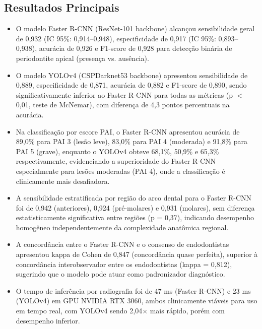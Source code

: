 \subsection{Resultados Principais}
\begin{itemize}
  \item O modelo Faster R-CNN (ResNet-101 backbone) alcançou
        sensibilidade geral de 0,932 (IC 95\%: 0,914--0,948),
        especificidade de 0,917 (IC 95\%: 0,893--0,938), acurácia de
        0,926 e F1-score de 0,928 para detecção binária de
        periodontite apical (presença vs. ausência).
  \item O modelo YOLOv4 (CSPDarknet53 backbone) apresentou
        sensibilidade de 0,889, especificidade de 0,871, acurácia de
        0,882 e F1-score de 0,890, sendo significativamente inferior
        ao Faster R-CNN para todas as métricas (p $<$ 0,01, teste de
        McNemar), com diferença de 4,3 pontos percentuais na acurácia.
  \item Na classificação por escore PAI, o Faster R-CNN apresentou
        acurácia de 89,0\% para PAI 3 (lesão leve), 83,0\% para
        PAI 4 (moderada) e 91,8\% para PAI 5 (grave), enquanto o
        YOLOv4 obteve 68,1\%, 50,9\% e 65,3\% respectivamente,
        evidenciando a superioridade do Faster R-CNN especialmente
        para lesões moderadas (PAI 4), onde a classificação é
        clinicamente mais desafiadora.
  \item A sensibilidade estratificada por região do arco dental para
        o Faster R-CNN foi de 0,942 (anteriores), 0,924 (pré-molares)
        e 0,931 (molares), sem diferença estatisticamente significativa
        entre regiões (p = 0,37), indicando desempenho homogêneo
        independentemente da complexidade anatômica regional.
  \item A concordância entre o Faster R-CNN e o consenso de
        endodontistas apresentou kappa de Cohen de 0,847
        (concordância quase perfeita), superior à concordância
        interobservador entre os endodontistas (kappa = 0,812),
        sugerindo que o modelo pode atuar como padronizador
        diagnóstico.
  \item O tempo de inferência por radiografia foi de 47 ms (Faster
        R-CNN) e 23 ms (YOLOv4) em GPU NVIDIA RTX 3060, ambos
        clinicamente viáveis para uso em tempo real, com YOLOv4
        sendo 2,04$\times$ mais rápido, porém com desempenho inferior.
\end{itemize}

